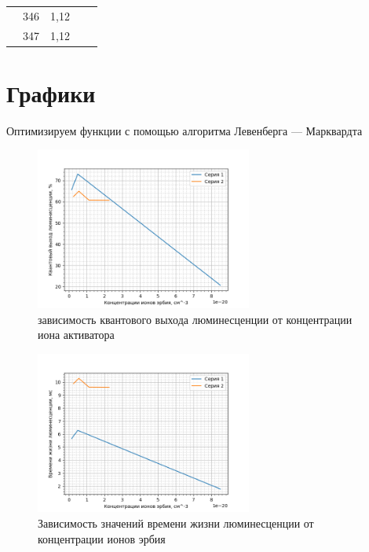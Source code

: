 \begin{table}[H]
{\begin{tabular}{|c|c|c|c|c|}
            & 346           & 1,12                                                                              &                                                                   &                                                                                            \\ \cline{2-3}
            & 347           & 1,12                                                                              &                                                                   &                                                                                            \\ \hline
\end{tabular}%
}
\end{table}

\section{Графики}\label{sec:graphics}
 Оптимизируем функции с помощью алгоритма Левенберга — Марквардта\cite{levenberg1944method}
\begin{figure}[H]
	\centering
	\includegraphics[width=2.8in]{figures/ContcentrationTheory}
	\caption{зависимость квантового выхода люминесценции от
концентрации иона активатора}
	\label{fig:someFigure0}
\end{figure}

\begin{figure}[H]
	\centering
	\includegraphics[width=2.8in]{figures/Contcentration}
	\caption{Зависимость значений времени жизни люминесценции
от концентрации ионов эрбия}
	\label{fig:Concentration}
\end{figure}

